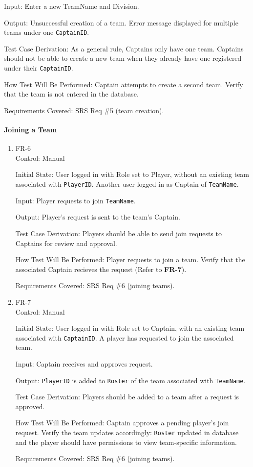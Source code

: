 \documentclass[12pt, titlepage]{article}
\begin{document}
\begin{enumerate}
Input: Enter a new TeamName and Division.

Output: Unsuccessful creation of a team. Error message displayed for multiple teams under one \texttt{CaptainID}.

Test Case Derivation: As a general rule, Captains only have one team. Captains should not be able to create a new team when they already have one registered under their \texttt{CaptainID}.

How Test Will Be Performed: Captain attempts to create a second team. Verify that the team is not entered in the database.

Requirements Covered: SRS Req \#5 (team creation).
\end{enumerate}

\paragraph{Joining a Team}

\begin{enumerate}

\item{FR-6\\}
Control: Manual

Initial State: User logged in with Role set to Player, without an existing team associated with \texttt{PlayerID}. Another user logged in as Captain of \texttt{TeamName}.

Input: Player requests to join \texttt{TeamName}.

Output: Player's request is sent to the team's Captain.

Test Case Derivation: Players should be able to send join requests to Captains for review and approval.

How Test Will Be Performed: Player requests to join a team. Verify that the associated Captain recieves the request (Refer to \textbf{FR-7}).

Requirements Covered: SRS Req \#6 (joining teams).

\item{FR-7\\}
Control: Manual

Initial State: User logged in with Role set to Captain, with an existing team associated with \texttt{CaptainID}. A player has requested to join the associated team.

Input: Captain receives and approves request.

Output: \texttt{PlayerID} is added to \texttt{Roster} of the team associated with \texttt{TeamName}.

Test Case Derivation: Players should be added to a team after a request is approved.

How Test Will Be Performed: Captain approves a pending player's join request. Verify the team updates accordingly: \texttt{Roster} updated in database and the player should have permissions to view team-specific information.

Requirements Covered: SRS Req \#6 (joining teams).

\end{enumerate}
\end{document}
